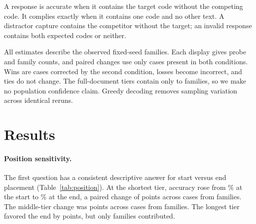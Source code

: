 \documentclass{article}
\begin{document}
A response is accurate when it contains the target code without the competing code. It complies exactly when it contains one code and no other text. A distractor capture contains the competitor without the target; an invalid response contains both expected codes or neither.

All estimates describe the observed fixed-seed families. Each display gives probe and family counts, and paired changes use only cases present in both conditions. Wins are cases corrected by the second condition, losses become incorrect, and ties do not change. The full-document tiers contain only \tierEightFamilyCount{} to \tierTwoFamilyCount{} families, so we make no population confidence claim. Greedy decoding removes sampling variation across identical reruns.

\section{Results}

\paragraph{Position sensitivity.}
The first question has a consistent descriptive answer for start versus end placement (Table~\ref{tab:position}). At the shortest tier, accuracy rose from \positionTwoStartAccuracy{}\% at the start to \positionTwoEndAccuracy{}\% at the end, a paired change of \positionTwoStartEndChange{} points across \positionTwoStartEndDenominator{} cases from \positionTwoStartEndFamilyCount{} families. The middle-tier change was \positionFourStartEndChange{} points across \positionFourStartEndDenominator{} cases from \positionFourStartEndFamilyCount{} families. The longest tier favored the end by \positionEightStartEndChange{} points, but only \positionEightStartEndFamilyCount{} families contributed.
\end{document}
